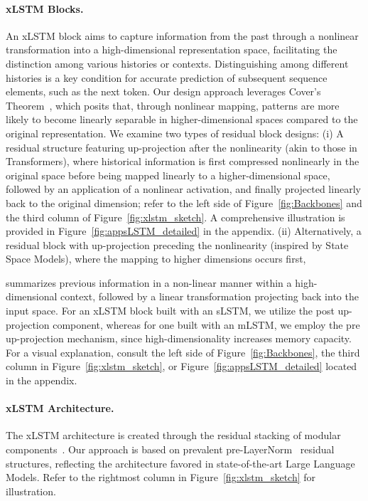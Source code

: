 \paragraph{xLSTM Blocks.}
\label{sec:xLSTMblock}
An xLSTM block aims to capture information from the past through a nonlinear transformation into a high-dimensional representation space, facilitating the distinction among various histories or contexts. Distinguishing among different histories is a key condition for accurate prediction of subsequent sequence elements, such as the next token. Our design approach leverages Cover’s Theorem~\citep{Cover:65}, which posits that, through nonlinear mapping, patterns are more likely to become linearly separable in higher-dimensional spaces compared to the original representation. We examine two types of residual block designs: (i) A residual structure featuring up-projection after the nonlinearity (akin to those in Transformers), where historical information is first compressed nonlinearly in the original space before being mapped linearly to a higher-dimensional space, followed by an application of a nonlinear activation, and finally projected linearly back to the original dimension; refer to the left side of Figure~\ref{fig:Backbones} and the third column of Figure~\ref{fig:xlstm_sketch}. 
A comprehensive illustration is provided in Figure~\ref{fig:appsLSTM_detailed} in the appendix. (ii) Alternatively, a residual block with up-projection preceding the nonlinearity (inspired by State Space Models), where the mapping to higher dimensions occurs first,

summarizes previous information in a non-linear manner within a high-dimensional context, followed by a linear transformation projecting back into the input space. For an xLSTM block built with an sLSTM, we utilize the post up-projection component, whereas for one built with an mLSTM, we employ the pre up-projection mechanism, since high-dimensionality increases memory capacity. For a visual explanation, consult the left side of Figure~\ref{fig:Backbones}, the third column in Figure~\ref{fig:xlstm_sketch}, or Figure~\ref{fig:appsLSTM_detailed} located in the appendix.

\paragraph{xLSTM Architecture. }
\label{sec:xLSTMarchitecure}
The xLSTM architecture is created through the residual stacking of modular components~\citep{Srivastava:15,He:16}. Our approach is based on prevalent pre-LayerNorm~\citep{Ba:16b} residual structures, reflecting the architecture favored in state-of-the-art Large Language Models. Refer to the rightmost column in Figure~\ref{fig:xlstm_sketch} for illustration.

